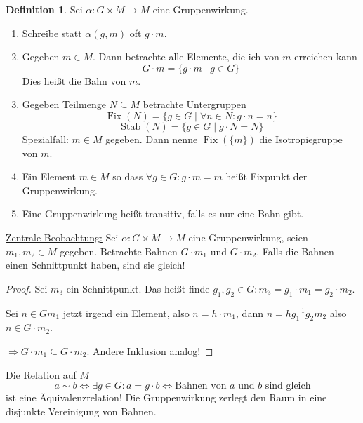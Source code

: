 \documentclass[12pt,parskip=full]{scrartcl}
\newcommand{\heading}{\underline}
\theoremstyle{definition}
\newtheorem{definition}[theorem]{Definition}
\theoremstyle{remark}
\begin{document}
	\begin{definition}
		\label{def:transivGruppe}
		Sei $\alpha: G \times M \to M$ eine Gruppenwirkung.
		\begin{enumerate}
			\item Schreibe statt $\alpha(g,m)$ oft $g \cdot m$.
			\item Gegeben $m \in M$. Dann betrachte alle Elemente, die ich von $m$ erreichen kann
			\begin{equation*}
			G \cdot m = \{ g \cdot m \mid g \in G \}
			\end{equation*}
			Dies heißt die Bahn von $m$.
			\item Gegeben Teilmenge $N \subseteq M$ betrachte Untergruppen
			\begin{equation*}
				\operatorname{Fix}(N) = \{ g \in G \mid \forall n \in N: g \cdot n = n \}
			\end{equation*}
			\begin{equation*}
				\operatorname{Stab}(N) = \{ g \in G \mid g \cdot N = N \}
			\end{equation*}
			Spezialfall: $m \in M$ gegeben. Dann nenne $\operatorname{Fix}(\{ m \})$ die Isotropiegruppe von $m$.
			\item Ein Element $m \in M$ so dass $\forall g \in G: g \cdot m = m$ heißt Fixpunkt der Gruppenwirkung.
			\item Eine Gruppenwirkung heißt transitiv, falls es nur eine Bahn gibt.
		\end{enumerate}
	\end{definition}

	\heading{Zentrale Beobachtung:} Sei $\alpha: G \times M \to M$ eine Gruppenwirkung, seien $m_1, m_2 \in M$ gegeben. Betrachte Bahnen $G \cdot m_1$ und $G \cdot m_2$. Falls die Bahnen einen Schnittpunkt haben, sind sie gleich!
	
	\begin{proof}
		Sei $m_3$ ein Schnittpunkt. Das heißt finde $g_1, g_2 \in G: m_3 = g_1 \cdot m_1 = g_2 \cdot m_2$.
		
		Sei $n \in G m_1$ jetzt irgend ein Element, also $n = h \cdot m_1$, dann $n = h g_1^{-1} g_2 m_2$ also $n \in G \cdot m_2$.
		
		$\Rightarrow G \cdot m_1 \subseteq G \cdot m_2$. Andere Inklusion analog!
	\end{proof}

	Die Relation auf $M$
	\begin{equation*}
		a \sim b \Leftrightarrow \exists g \in G: a = g \cdot b \Leftrightarrow \text{Bahnen von $a$ und $b$ sind gleich}
	\end{equation*}
	ist eine Äquivalenzrelation! Die Gruppenwirkung zerlegt den Raum in eine disjunkte Vereinigung von Bahnen.
	
\end{document}

